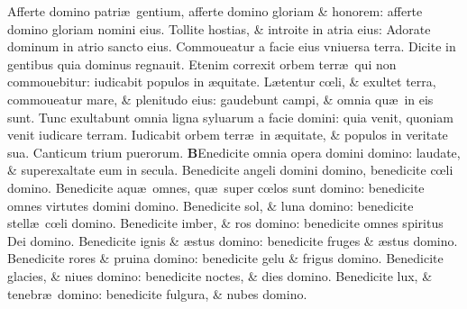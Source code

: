 \documentclass[a5paper,10pt]{book}
\def\ae{æ}
\def\oe{œ}
\begin{document}
\begin{multicols*}{2}
\newline \color{red} A\color{black}fferte domino patri\ae \ gentium, afferte domino gloriam \& honorem: afferte domino gloriam nomini eius.
\newline \color{red} T\color{black}ollite hostias, \& introite in atria eius: Adorate dominum in atrio sancto eius.
\newline \color{red} C\color{black}ommoueatur a facie eius vniuersa terra. Dicite in gentibus quia dominus regnauit.
\newline \color{red} E\color{black}tenim correxit orbem terr\ae \ qui non commouebitur: iudicabit populos in \ae quitate.
\newline \color{red} L\color{black}\ae tentur c\oe li, \& exultet terra, commoueatur mare, \& plenitudo eius: gaudebunt campi, \& omnia qu\ae \ in eis sunt.
\newline \color{red} T\color{black}unc exultabunt omnia ligna syluarum a facie domini: quia venit, quoniam venit iudicare terram.
\newline \color{red} I\color{black}udicabit orbem terr\ae \ in \ae quitate, \& populos in veritate sua.
\newline \color{red} Canticum trium puerorum. \color{black}
\vspace{-1em}
\lettrine[lines=2]{\bfseries \color{red} B}{}Enedicite omnia opera domini domino: laudate, \& superexaltate eum in secula.
\newline \color{red} B\color{black}enedicite angeli domini domino, benedicite c\oe li domino.
\newline \color{red} B\color{black}enedicite aqu\ae \ omnes, qu\ae \ super c\oe los sunt domino: benedicite omnes virtutes domini domino.
\newline \color{red} B\color{black}enedicite sol, \& luna domino: benedicite stell\ae \ c\oe li domino.
\newline \color{red} B\color{black}enedicite imber, \& ros domino: benedicite omnes spiritus Dei domino.
\newline \color{red} B\color{black}enedicite ignis \& \ae stus domino: benedicite fruges \& \ae stus domino.
\newline \color{red} B\color{black}enedicite rores \& pruina domino: benedicite gelu \& frigus domino.
\newline \color{red} B\color{black}enedicite glacies, \& niues domino: benedicite noctes, \& dies domino.
\newline \color{red} B\color{black}enedicite lux, \& tenebr\ae \ domino: benedicite fulgura, \& nubes domino.

\end{multicols*}
\end{document}
